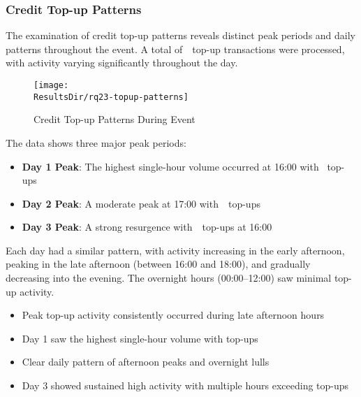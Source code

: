 
\subsubsection{Credit Top-up Patterns}
\label{subsubsec:analysis-credit-topup}


The examination of credit top-up patterns reveals distinct peak periods and daily patterns throughout the event.
A total of~~top-up transactions were processed, with activity varying significantly throughout the day.

\begin{figure}[H]
	\centering
	\texttt{[image: \\ResultsDir/rq23-topup-patterns]}
	\caption{Credit Top-up Patterns During Event}
	\label{fig:topup-patterns}
	\source
\end{figure}

The data shows three major peak periods:
\begin{itemize}
	\item \textbf{Day 1 Peak}: The highest single-hour volume occurred at 16:00 with ~top-ups
	\item \textbf{Day 2 Peak}: A moderate peak at 17:00 with~~top-ups
	\item \textbf{Day 3 Peak}: A strong resurgence with~~top-ups at 16:00
\end{itemize}

Each day had a similar pattern, with activity increasing in the early afternoon, peaking in the late afternoon (between 16:00 and 18:00), and gradually decreasing into the evening.
The overnight hours (00:00–12:00) saw minimal top-up activity.

\begin{keytakeaways}
	\begin{itemize}
		\item Peak top-up activity consistently occurred during late afternoon hours
		\item Day 1 saw the highest single-hour volume with  top-ups
		\item Clear daily pattern of afternoon peaks and overnight lulls
		\item Day 3 showed sustained high activity with multiple hours exceeding  top-ups
	\end{itemize}
\end{keytakeaways}

